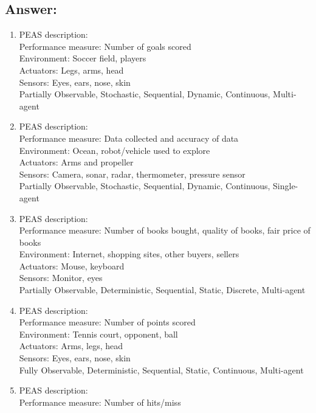 \documentclass{article}
\begin{document}
\subsection*{Answer:}

\begin{enumerate}[label= (\alph*)]
    \item PEAS description: 
    \\Performance measure: Number of goals scored \\Environment: Soccer field, players 
    \\Actuators: Legs, arms, head
    \\Sensors: Eyes, ears, nose, skin
    \\Partially Observable, Stochastic, Sequential, Dynamic, Continuous, Multi-agent
    \item PEAS description: 
    \\Performance measure: Data collected and accuracy of data 
    \\Environment: Ocean, robot/vehicle used to explore
    \\Actuators: Arms and propeller
    \\Sensors: Camera, sonar, radar, thermometer, pressure sensor
    \\Partially Observable, Stochastic, Sequential, Dynamic, Continuous, Single-agent
    \item PEAS description: 
    \\Performance measure: Number of books bought, quality of books, fair price of books 
    \\Environment: Internet, shopping sites, other buyers, sellers
    \\Actuators: Mouse, keyboard
    \\Sensors: Monitor, eyes
    \\Partially Observable, Deterministic, Sequential, Static, Discrete, Multi-agent
    \item PEAS description: 
    \\Performance measure: Number of points scored \\Environment: Tennis court, opponent, ball
    \\Actuators: Arms, legs, head 
    \\Sensors: Eyes, ears, nose, skin
    \\Fully Observable, Deterministic, Sequential, Static, Continuous, Multi-agent
    \item PEAS description: 
    \\Performance measure: Number of hits/miss 

\end{enumerate}
\end{document}
